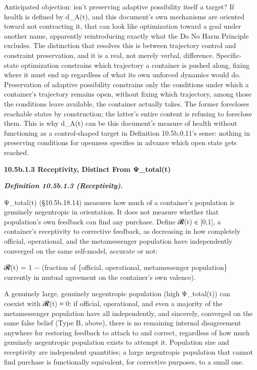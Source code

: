 \documentclass[
]{article}
\begin{document}
Anticipated objection: isn't preserving adaptive possibility itself a
target? If health is defined by d\_A(t), and this document's own
mechanisms are oriented toward not contracting it, that can look like
optimization toward a goal under another name, apparently reintroducing
exactly what the Do No Harm Principle excludes. The distinction that
resolves this is between trajectory control and constraint preservation,
and it is a real, not merely verbal, difference. Specific-state
optimization constrains which trajectory a container is pushed along,
fixing where it must end up regardless of what its own unforced dynamics
would do. Preservation of adaptive possibility constrains only the
conditions under which a container's trajectory remains open, without
fixing which trajectory, among those the conditions leave available, the
container actually takes. The former forecloses reachable states by
construction; the latter's entire content is refusing to foreclose them.
This is why d\_A(t) can be this document's measure of health without
functioning as a control-shaped target in Definition 10.5b.0.11's sense:
nothing in preserving conditions for openness specifies in advance which
open state gets reached.

\textbf{10.5b.1.3 Receptivity, Distinct From Ψ\_total(t)}

\emph{\textbf{Definition 10.5b.1.3 (Receptivity).}}

Ψ\_total(t) (§10.5b.18.14) measures how much of a container's population
is genuinely negentropic in orientation. It does not measure whether
that population's own feedback can find any purchase. Define 𝓡(t) ∈
{[}0,1{]}, a container's receptivity to corrective feedback, as
decreasing in how completely official, operational, and the
metamessenger population have independently converged on the same
self-model, accurate or not:

𝓡(t) = 1 − (fraction of \{official, operational, metamessenger
population\} currently in mutual agreement on the container's own
valence).

A genuinely large, genuinely negentropic population (high Ψ\_total(t))
can coexist with 𝓡(t) ≈ 0: if official, operational, and even a majority
of the metamessenger population have all independently, and sincerely,
converged on the same false belief (Type B, above), there is no
remaining internal disagreement anywhere for restoring feedback to
attach to and correct, regardless of how much genuinely negentropic
population exists to attempt it. Population size and receptivity are
independent quantities; a large negentropic population that cannot find
purchase is functionally equivalent, for corrective purposes, to a small
one.
\end{document}
